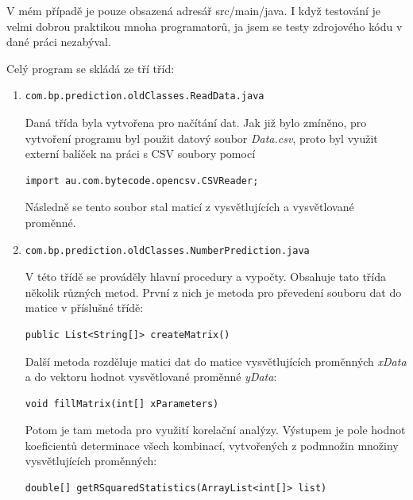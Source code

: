 \documentclass[a4paper,12pt,twoside]{scrreprt}
\begin{document}
V mém případě je pouze obsazená adresář src/main/java. I když testování je velmi dobrou praktikou mnoha programatorů, ja jsem se testy zdrojového kódu v dané práci nezabýval. 

Celý program se skládá ze tří tříd: 

\begin{enumerate}
\item \begin{lstlisting}
com.bp.prediction.oldClasses.ReadData.java
\end{lstlisting}

Daná třída byla vytvořena pro načítání dat. Jak již bylo zmíněno, pro vytvoření programu byl použit datový soubor \textit{Data.csv}, proto byl využit externí balíček na práci s CSV soubory pomocí

\begin{lstlisting}
import au.com.bytecode.opencsv.CSVReader;
\end{lstlisting}

Následně se tento soubor stal maticí z vysvětlujících a vysvětlované proměnné. 

\item \begin{lstlisting}
com.bp.prediction.oldClasses.NumberPrediction.java
\end{lstlisting}

V této třídě se prováděly hlavní procedury a vypočty. Obsahuje tato třída několik různých metod. 
První z nich je metoda pro převedení souboru dat do matice v příslušné třídě:

\begin{lstlisting}
public List<String[]> createMatrix()
\end{lstlisting}

Další metoda rozděluje matici dat do matice vysvětlujících proměnných \textit{xData} a do vektoru hodnot vysvětlované proměnné \textit{yData}:

\begin{lstlisting}
void fillMatrix(int[] xParameters) 
\end{lstlisting}

Potom je tam metoda pro využití korelační analýzy. Výstupem je pole hodnot koeficientů determinace všech kombinací, vytvořených z podmnožin množiny vysvětlujících proměnných:

\begin{lstlisting}
double[] getRSquaredStatistics(ArrayList<int[]> list)
\end{lstlisting}


\end{enumerate}
\end{document}
